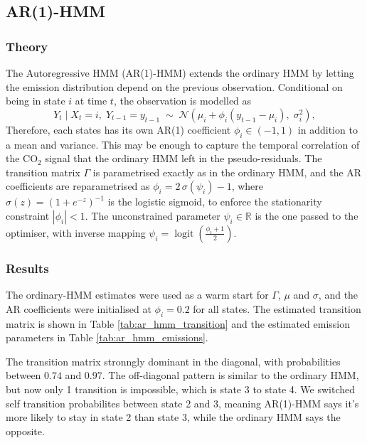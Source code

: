 \subsection{AR(1)-HMM}
\subsubsection{Theory}
The Autoregressive HMM (AR(1)-HMM) extends the ordinary HMM by letting the
emission distribution depend on the previous observation. Conditional on
being in state $i$ at time $t$, the observation is modelled as
\begin{equation}
    Y_t \mid X_t = i,\; Y_{t-1} = y_{t-1} \;\sim\; \mathcal{N}\!\left(\mu_i + \phi_i(y_{t-1} - \mu_i),\; \sigma_i^2\right),
    \label{eq:ar1_emission}
\end{equation}
Therefore, each states has its own AR(1) coefficient $\phi_i \in (-1, 1)$ in
addition to a mean and variance. This may be enough to capture the temporal
correlation of the CO$_2$ signal that the ordinary HMM left in the
pseudo-residuals. The transition matrix $\Gamma$ is parametrised exactly as in
the ordinary HMM, and the AR coefficients are reparametrised as
$\phi_i = 2\,\sigma(\psi_i) - 1$, where
$\sigma(z) = (1 + e^{-z})^{-1}$ is the logistic sigmoid, to enforce the
stationarity constraint $|\phi_i| < 1$. \newline
The unconstrained parameter
$\psi_i \in \mathbb{R}$ is the one passed to the optimiser, with inverse
mapping $\psi_i = \operatorname{logit}\!\left(\tfrac{\phi_i + 1}{2}\right)$.

\subsubsection{Results} 
The ordinary-HMM estimates were used as a warm start for $\Gamma$, $\mu$ and
$\sigma$, and the AR coefficients were initialised at $\phi_i = 0.2$ for all
states. The estimated transition matrix is shown in
Table \ref{tab:ar_hmm_transition} and the estimated emission parameters in
Table \ref{tab:ar_hmm_emissions}.



The transition matrix stronngly dominant in the diagonal, 
with probabilities between $0.74$ and $0.97$. The off-diagonal pattern is
similar to the ordinary HMM, but now only 1 transition is impossible, which is 
state 3 to state 4. We switched self transition probabilites between state 2 and 3, meaning
AR(1)-HMM says it's more likely to stay in state 2 than state 3, while the ordinary HMM says the opposite.

